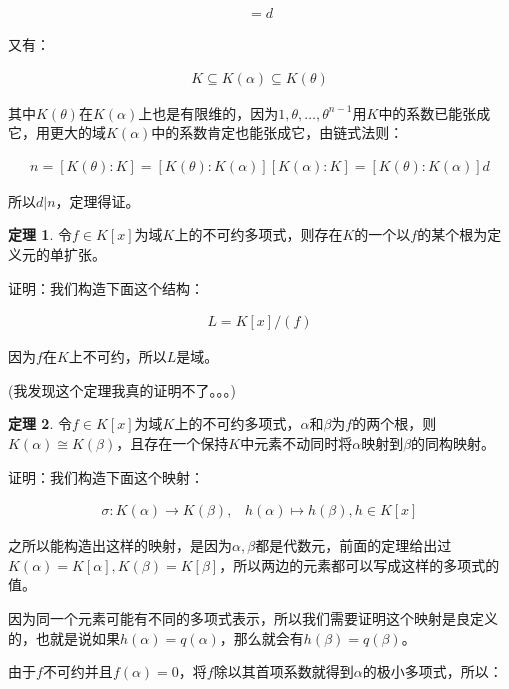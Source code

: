 \documentclass[12pt, a4paper, oneside]{ctexart}
\theoremstyle{definition}
\newtheorem*{theorem}{定理}
\begin{document}
\begin{align*}
[K(\alpha):K]=d
\end{align*}

又有：

\begin{align*}
K\subseteq K(\alpha)\subseteq K(\theta)
\end{align*}

其中$K(\theta)$在$K(\alpha)$上也是有限维的，因为$1,\theta,\ldots,\theta^{n-1}$用$K$中的系数已能张成它，用更大的域$K(\alpha)$中的系数肯定也能张成它，由链式法则：

\begin{align*}
n=[K(\theta):K]=[K(\theta):K(\alpha)][K(\alpha):K]=[K(\theta):K(\alpha)]d
\end{align*}

所以$d|n$，定理得证。

\begin{theorem}
令$f\in K[x]$为域$K$上的不可约多项式，则存在$K$的一个以$f$的某个根为定义元的单扩张。
\end{theorem}

证明：我们构造下面这个结构：

\begin{align*}
L=K[x]/(f)
\end{align*}

因为$f$在$K$上不可约，所以$L$是域。

(我发现这个定理我真的证明不了。。。)

\begin{theorem}
令$f\in K[x]$为域$K$上的不可约多项式，$\alpha$和$\beta$为$f$的两个根，则$K(\alpha)\cong K(\beta)$，且存在一个保持$K$中元素不动同时将$\alpha$映射到$\beta$的同构映射。
\end{theorem}


证明：我们构造下面这个映射：

\begin{align*}
\sigma: K(\alpha)\rightarrow K(\beta),\;\;\; h(\alpha)\mapsto h(\beta),h\in K[x]
\end{align*}

之所以能构造出这样的映射，是因为$\alpha,\beta$都是代数元，前面的定理给出过$K(\alpha)=K[\alpha],K(\beta)=K[\beta]$，所以两边的元素都可以写成这样的多项式的值。

因为同一个元素可能有不同的多项式表示，所以我们需要证明这个映射是良定义的，也就是说如果$h(\alpha)=q(\alpha)$，那么就会有$h(\beta)=q(\beta)$。

由于$f$不可约并且$f(\alpha)=0$，将$f$除以其首项系数就得到$\alpha$的极小多项式，所以：
\end{document}
